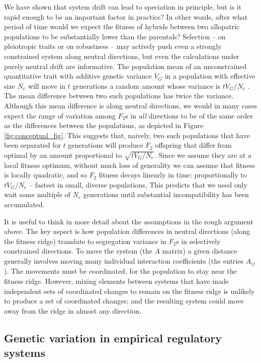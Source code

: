 \documentclass{article}
\newcommand{\1}{\mathbbm{1}}
\begin{document}
We have shown that system drift can lead to speciation in principle,
but is it rapid enough to be an important factor in practice?
In other words, after what period of time would we expect the fitness of hybrids
between two allopatric populations to be substantially lower than the parentals?
Selection -- on pleiotropic traits or on robustness --
may actively push even a strongly constrained system along neutral directions,
but even the calculations under purely neutral drift are informative.
The population mean of an unconstrained quantitative trait
with additive genetic variance $V_G$ in a population with effective size $N_e$
will move in $t$ generations a random amount whose variance is $t V_G / N_e$ \citep{lande1976natural}.
The mean difference between two such populations has twice the variance.
Although this mean difference is along neutral directions,
we would in many cases expect the range of variation among $F_2$s
in \emph{all} directions to be of the same order
as the differences between the populations, 
as depicted in Figure \ref{fig:conceptual_fig}.
This suggests that, naively, two such populations that have been separated for $t$ generations
will produce $F_2$ offspring that differ from optimal by an amount proportional to $\sqrt{t V_G / N_e}$.
Since we assume they are at a local fitness optimum, without much loss of generality we can assume
that fitness is locally quadratic, and so $F_2$ fitness decays linearly in time:
proportionally to $t V_G / N_e$ -- fastest in small, diverse populations,
This predicts that we need only wait some multiple of $N_e$ generations
until substantial incompatibility has been accumulated.

It is useful to think in more detail about the assumptions in the rough argument above.
The key aspect is how population differences in neutral directions
(along the fitness ridge)
translate to segregation variance in $F_2$s in selectively constrained directions.
To move the system (the $A$ matrix) a given distance
generally involves moving many individual interaction coefficients (the entries $A_{ij}$).
The movements must be coordinated, for the population to stay near the fitness ridge.
However, mixing elements between systems that have made independent sets of coordinated changes
to remain on the fitness ridge
is unlikely to produce a set of coordinated changes;
and the resulting system could move away from the ridge in almost any direction.


\subsection*{Genetic variation in empirical regulatory systems}
\end{document}
